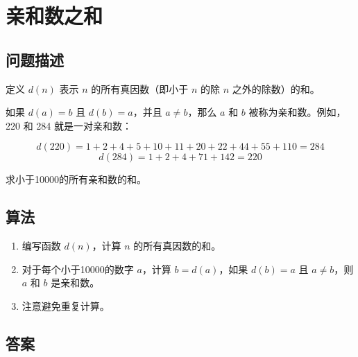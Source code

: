 \section{亲和数之和}
\subsection{问题描述}
\begin{tcolorbox}
	定义 $d(n)$ 表示 $n$ 的所有真因数（即小于 $n$ 的除 $n$ 之外的除数）的和。

	如果 $d(a) = b$ 且 $d(b) = a$，并且 $a \neq b$，那么 $a$ 和 $b$ 被称为亲和数。例如，220 和 284 就是一对亲和数：

	\[
		d(220) = 1 + 2 + 4 + 5 + 10 + 11 + 20 + 22 + 44 + 55 + 110 = 284
	\]
	\[
		d(284) = 1 + 2 + 4 + 71 + 142 = 220
	\]

	求小于10000的所有亲和数的和。
\end{tcolorbox}

\subsection{算法}
\begin{enumerate}
	\item 编写函数 $d(n)$，计算 $n$ 的所有真因数的和。
	\item 对于每个小于10000的数字 $a$，计算 $b = d(a)$，如果 $d(b) = a$ 且 $a \neq b$，则 $a$ 和 $b$ 是亲和数。
	\item 注意避免重复计算。
\end{enumerate}

\subsection{答案}
